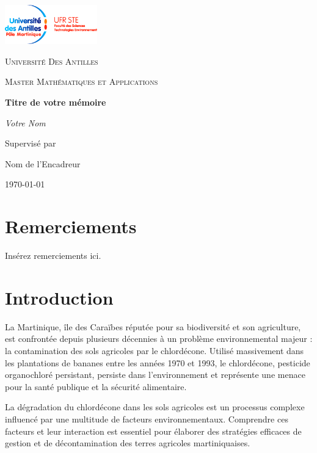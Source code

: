 \documentclass{report}
\begin{document}
\begin{titlepage}
    \centering
    \includegraphics[width=0.3\textwidth]{logo.jpg}\par\vspace{1cm}
    {\scshape\Large Université Des Antilles \par}
    \vspace{1cm}
    {\scshape\Large Master Mathématiques et Applications \par}
    \vspace{3cm}
    {\huge\bfseries Titre de votre mémoire \par}
    \vspace{3cm}
    {\Large\itshape Votre Nom \par}
    \vfill
    Supervisé par\par
    Nom de l'Encadreur

    \vfill

    {\large \today\par}
\end{titlepage}

\chapter*{Remerciements}

Insérez remerciements ici.

\tableofcontents
\newpage

\chapter*{Introduction}

La Martinique, île des Caraïbes réputée pour sa biodiversité et son agriculture, est confrontée depuis plusieurs décennies à un problème environnemental majeur : la contamination des sols agricoles par le chlordécone. Utilisé massivement dans les plantations de bananes entre les années 1970 et 1993, le chlordécone, pesticide organochloré persistant, persiste dans l'environnement et représente une menace pour la santé publique et la sécurité alimentaire.

La dégradation du chlordécone dans les sols agricoles est un processus complexe influencé par une multitude de facteurs environnementaux. Comprendre ces facteurs et leur interaction est essentiel pour élaborer des stratégies efficaces de gestion et de décontamination des terres agricoles martiniquaises.
\end{document}

